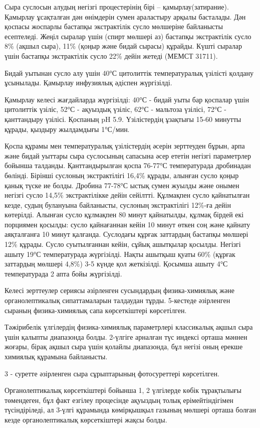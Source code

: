 \begin{multicols}{2}
Сыра суслосын алудың негізгі процестерінің бірі -- қамырлау(затирание).
Қамырлау ұсақталған дән өнімдерін сумен араластыру арқылы басталады. Дән
қоспасы жоспарлы бастапқы экстрактілік сусло мөлшеріне байланысты
есептеледі. Жеңіл сыралар үшін (спирт мөлшері аз) бастапқы экстрактілік
сусло 8\% (ақшыл сыра), 11\% (қоңыр және бидай сырасы) құрайды. Күшті
сыралар үшін бастапқы экстрактілік сусло 22\% дейін жетеді (МЕМСТ
31711).

Бидай уытынан сусло алу үшін 40°С цитолиттік температуралық үзілісті
қолдану ұсынылады. Қамырлау инфузиялық әдіспен жүргізілді.

Қамырлау келесі жағдайларда жүргізілді: 40°С - бидай уыты бар қоспалар
үшін цитолиттік үзіліс, 52°С - ақуыздық үзіліс, 62°С - мальтоза үзілісі,
72°С - қанттандыру үзілісі. Қоспаның pH 5.9. Үзілістердің ұзақтығы 15-60
минутты құрады, қыздыру жылдамдығы 1°С/мин.

Қоспа құрамы мен температуралық үзілістердің әсерін зерттеуден бұрын,
арпа және бидай уыттары сыра суслосының сапасына әсер ететін негізгі
параметрлер бойынша талданды. Қанттандырылған қоспа 76-77°С
температурада дробинадан бөлінді. Бірінші суслоның экстрактілігі 16,4\%
құрады, алынған сусло қоңыр қанық түске ие болды. Дробина 77-78°С ыстық
сумен жуылды және онымен негізгі сусло 14,5\% экстрактілікке дейін
сейілтті. Құлмақпен сусло қайнатылған кезде, судың булануына байланысты,
суслоның экстрактілігі 12\%-ға дейін көтерілді. Алынған сусло құлмақпен
80 минут қайнатылды, құлмақ бірдей екі порциямен қосылды: сусло
қайнағаннан кейін 10 минут өткен соң және қайнату аяқталғанға 10 минут
қалғанда. Суслодағы құрғак заттардың бастапқы мөлшері 12\% құрады. Сусло
суытылғаннан кейін, сұйық ашытқылар қосылды. Негізгі ашыту 19°С
температурада жүргізілді. Нақты ашытқыш қуаты 60\% (құрғак заттардың
мөлшері 4,8\%) 3-5 күнде қол жеткізілді. Қосымша ашыту 4°С температурада
2 апта бойы жүргізілді.

Келесі зерттеулер сериясы әзірленген сусындардың физика-химиялық және
органолептикалық сипаттамаларын талдаудан тұрды. 5-кестеде әзірленген
сыраның физика-химиялық сапа көрсеткіштері көрсетілген.

Тәжірибелік үлгілердің физика-химиялық параметрлері классикалық ақшыл
сыра үшін қалыпты диапазонда болды. 2-үлгіге арналған түс индексі орташа
мәннен жоғары, бірақ ақшыл сыра үшін қолайлы диапазонда, бұл негізі оның
ерекше химиялық құрамына байланысты.

3 - суретте әзірленген сыра сұрыптарының фотосуреттері көрсетілген.

Органолептикалық көрсеткіштері бойынша 1, 2 үлгілерде көбік тұрақтылығы
төмендеген, бұл факт езгілеу процесінде ақуыздың толық ерімейтіндігімен
түсіндіріледі, ал 3-үлгі құрамында көмірқышқыл газының мөлшері орташа
болған кезде органолептикалық көрсеткіштері жақсы болды.
\end{multicols}

